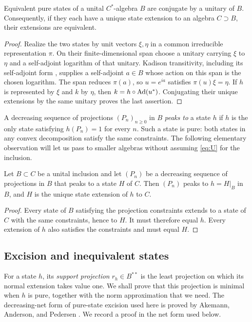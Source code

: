 \begin{lemma}\label{na:unitary-states}
Equivalent pure states of a unital $C^*$-algebra $B$ are conjugate by a unitary
of $B$.  Consequently, if they each have a unique state extension to an
algebra $C\supset B$, their extensions are equivalent.
\end{lemma}
\begin{proof}
Realize the two states by unit vectors $\xi,\eta$ in a common irreducible
representation $\pi$.  On their finite-dimensional span choose a unitary
carrying $\xi$ to $\eta$ and a self-adjoint logarithm of that unitary.
Kadison transitivity, including its self-adjoint form
\cite[Theorem~1]{Kadison1957}, supplies a self-adjoint $a\in B$ whose action
on this span is the chosen logarithm.  The span reduces $\pi(a)$, so
$u=e^{ia}$ satisfies $\pi(u)\xi=\eta$.  If $h$ is represented by $\xi$
and $k$ by $\eta$, then $k=h\circ\operatorname{Ad}(u^*)$.
Conjugating their unique extensions by the same unitary proves the last
assertion.
\end{proof}

A decreasing sequence of projections $(P_n)_{n\ge0}$ in $B$ \emph{peaks to}
a state $h$ if $h$ is the only state satisfying $h(P_n)=1$ for every $n$.
Such a state is pure: both states in any convex decomposition satisfy the
same constraints.  The following elementary observation will let us pass to
smaller algebras without assuming \eqref{eq:U} for the inclusion.

\begin{lemma}\label{na:peaking-restriction}
Let $B\subset C$ be a unital inclusion and let $(P_n)$ be a decreasing
sequence of projections in $B$ that peaks to a state $H$ of $C$.
Then $(P_n)$ peaks to $h=H|_B$ in $B$, and $H$ is the unique state extension
of $h$ to $C$.
\end{lemma}
\begin{proof}
Every state of $B$ satisfying the projection constraints extends to a state
of $C$ with the same constraints, hence to $H$.  It must therefore equal
$h$.  Every extension of $h$ also satisfies the constraints and must equal
$H$.
\end{proof}

\subsection{Excision and inequivalent states}

For a state $h$, its \emph{support projection} $r_h\in B^{**}$ is the least
projection on which its normal extension takes value one.  We shall prove
that this projection is minimal when $h$ is pure, together with the norm
approximation that we need. The decreasing-net form of pure-state
excision used here is proved by Akemann, Anderson, and Pedersen
\cite[Proposition~2.2]{AkemannAndersonPedersen1986}. We record a proof
in the net form used below.

